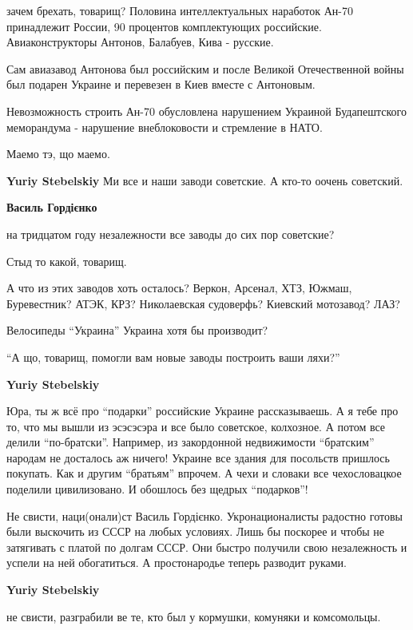\begin{itemize}
\begin{itemize}
\begin{itemize}
зачем брехать, товарищ? Половина интеллектуальных наработок Ан-70 принадлежит
России, 90 процентов комплектующих российские. Авиаконструкторы Антонов,
Балабуев, Кива - русские.

Сам авиазавод Антонова был российским и после Великой Отечественной войны был
подарен Украине и перевезен в Киев вместе с Антоновым.

Невозможность строить Ан-70 обусловлена нарушением Украиной Будапештского
меморандума - нарушение внеблоковости и стремление в НАТО.

Маемо тэ, що маемо.

\textbf{Yuriy Stebelskiy} Ми все и наши заводи советские. А кто-то оочень советский.

\textbf{Василь Гордієнко} 

на тридцатом году незалежности все заводы до сих пор советские?

Стыд то какой, товарищ.

А что из этих заводов хоть осталось? Веркон, Арсенал, ХТЗ, Южмаш, Буревестник?
АТЭК, КРЗ? Николаевская судоверфь? Киевский мотозавод? ЛАЗ?

Велосипеды \enquote{Украина} Украина хотя бы производит?

\enquote{А що, товарищ, помогли вам новые заводы построить ваши ляхи?}

\textbf{Yuriy Stebelskiy} 

Юра, ты ж всё про \enquote{подарки} российские Украине рассказываешь. А я тебе про то,
что мы вышли из эсэсэсэра и все было советское, колхозное. А потом все делили
\enquote{по-братски}. Например, из закордонной недвижимости \enquote{братским} народам не
досталось аж ничего! Украине все здания для посольств пришлось покупать. Как и
другим \enquote{братьям} впрочем. А чехи и словаки все чехословацкое поделили
цивилизовано. И обошлось без щедрых \enquote{подарков}!


Не свисти, наци(онали)ст Василь Гордієнко. Укронационалисты радостно готовы
были выскочить из СССР на любых условиях. Лишь бы поскорее и чтобы не
затягивать с платой по долгам СССР. Они быстро получили свою незалежность и
успели на ней обогатиться. А простонародье теперь разводит руками.

\textbf{Yuriy Stebelskiy} 

не свисти, разграбили ве те, кто был у кормушки, комуняки и комсомольцы.


\end{itemize}
\end{itemize}
\end{itemize}
